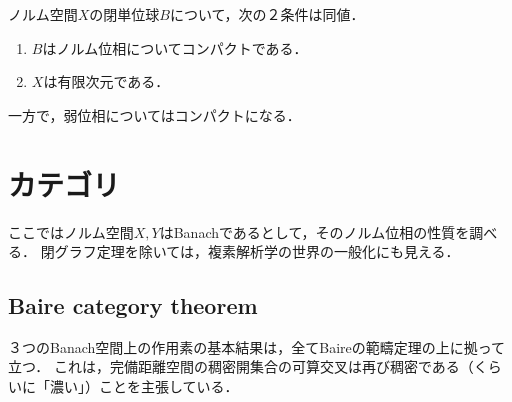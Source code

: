 \documentclass[uplatex,dvipdfmx]{jsreport}
\begin{document}
\begin{proposition}[有限次元空間の特徴付け]\label{prop-unit-ball-in-normed-space}
    ノルム空間$X$の閉単位球$B$について，次の２条件は同値．
    \begin{enumerate}
        \item $B$はノルム位相についてコンパクトである．
        \item $X$は有限次元である．
    \end{enumerate}
\end{proposition}
\begin{remark}
    一方で，弱位相についてはコンパクトになる．
\end{remark}

\section{カテゴリ}

\begin{tcolorbox}[colframe=ForestGreen, colback=ForestGreen!10!white,breakable,colbacktitle=ForestGreen!40!white,coltitle=black,fonttitle=\bfseries\sffamily,
title=]
    ここではノルム空間$X,Y$はBanachであるとして，そのノルム位相の性質を調べる．
    閉グラフ定理を除いては，複素解析学の世界の一般化にも見える．
\end{tcolorbox}

\subsection{Baire category theorem}

\begin{tcolorbox}[colframe=ForestGreen, colback=ForestGreen!10!white,breakable,colbacktitle=ForestGreen!40!white,coltitle=black,fonttitle=\bfseries\sffamily,
title=]
    ３つのBanach空間上の作用素の基本結果は，全てBaireの範疇定理の上に拠って立つ．
    これは，完備距離空間の稠密開集合の可算交叉は再び稠密である（くらいに「濃い」）ことを主張している．
\end{tcolorbox}
\end{document}
